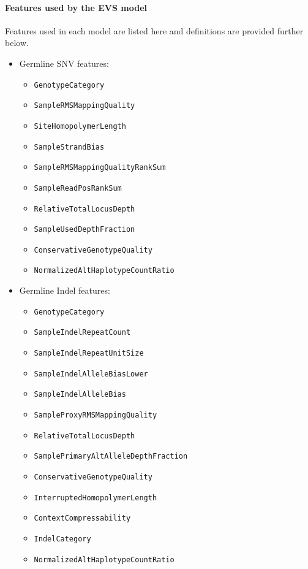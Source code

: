 \documentclass{article}
\begin{document}
\paragraph{Features used by the EVS model}

Features used in each model are listed here and definitions are provided further below.

\begin{itemize}
    \item Germline SNV features:
    \begin{itemize}
        \item \texttt{GenotypeCategory}
        \item \texttt{SampleRMSMappingQuality}
        \item \texttt{SiteHomopolymerLength}
        \item \texttt{SampleStrandBias}
        \item \texttt{SampleRMSMappingQualityRankSum}
        \item \texttt{SampleReadPosRankSum}
        \item \texttt{RelativeTotalLocusDepth}
        \item \texttt{SampleUsedDepthFraction}
        \item \texttt{ConservativeGenotypeQuality}
        \item \texttt{NormalizedAltHaplotypeCountRatio}
    \end{itemize}
    \item Germline Indel features:
    \begin{itemize}
        \item \texttt{GenotypeCategory}
        \item \texttt{SampleIndelRepeatCount}
        \item \texttt{SampleIndelRepeatUnitSize}
        \item \texttt{SampleIndelAlleleBiasLower}
        \item \texttt{SampleIndelAlleleBias}
        \item \texttt{SampleProxyRMSMappingQuality}
        \item \texttt{RelativeTotalLocusDepth}
        \item \texttt{SamplePrimaryAltAlleleDepthFraction}
        \item \texttt{ConservativeGenotypeQuality}
        \item \texttt{InterruptedHomopolymerLength}
        \item \texttt{ContextCompressability}
        \item \texttt{IndelCategory}
        \item \texttt{NormalizedAltHaplotypeCountRatio}
    \end{itemize}


\end{itemize}
\end{document}
